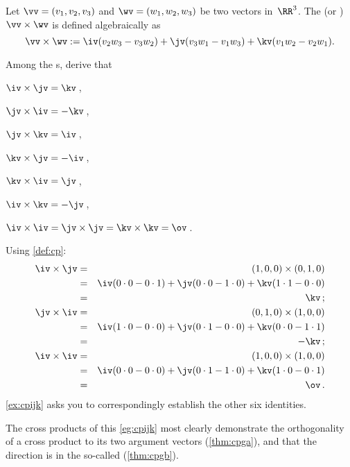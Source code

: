 \begin{definition} \label{def:cp}
Let \(\vv=(v_1,v_2,v_3)\) and \(\wv=(w_1,w_2,w_3)\) be two vectors in~\(\RR^3\).
The   (or ) \(\vv\times\wv\) is defined algebraically as
%
\begin{equation*}
\vv\times\wv:=\iv(v_2w_3-v_3w_2)
+\jv(v_3w_1-v_1w_3)
+\kv(v_1w_2-v_2w_1).
\end{equation*}
\end{definition}


\begin{example} \label{eg:cpijk}
Among the s, derive that 
%
\begin{Parts}
\item \(\iv\times\jv=\kv\)\,, \item \(\jv\times\iv=-\kv\)\,,
\item \(\jv\times\kv=\iv\)\,, \item \(\kv\times\jv=-\iv\)\,,
\item \(\kv\times\iv=\jv\)\,, \item \(\iv\times\kv=-\jv\)\,,
\item \(\iv\times\iv=\jv\times\jv=\kv\times\kv=\ov\)\,.
\end{Parts}
\begin{solution} Using \cref{def:cp}:
\begin{eqnarray*}
\iv\times\jv&=&(1,0,0)\times(0,1,0)
\\&=&\iv(0\cdot0-0\cdot1)
+\jv(0\cdot0-1\cdot0)
+\kv(1\cdot1-0\cdot0)
\\&=&\kv\,;
\\\jv\times\iv&=&(0,1,0)\times(1,0,0)
\\&=&\iv(1\cdot0-0\cdot0)
+\jv(0\cdot1-0\cdot0)
+\kv(0\cdot0-1\cdot1)
\\&=&-\kv\,;
\\\iv\times\iv&=&(1,0,0)\times(1,0,0)
\\&=&\iv(0\cdot0-0\cdot0)
+\jv(0\cdot1-1\cdot0)
+\kv(1\cdot0-0\cdot1)
\\&=&\ov\,.
\end{eqnarray*}
\cref{ex:cpijk} asks you to correspondingly establish the other six identities.
\end{solution}
\end{example}


The cross products of this \cref{eg:cpijk} most clearly demonstrate the orthogonality of a cross product to its two argument vectors (\cref{thm:cpga}), and that the direction is in the so-called  (\cref{thm:cpgb}).



